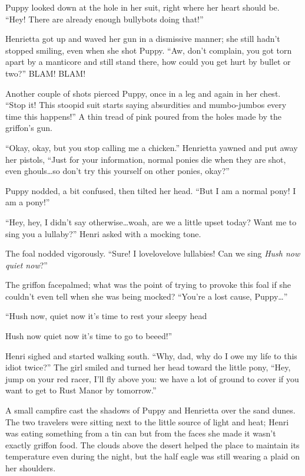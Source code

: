 Puppy looked down at the hole in her suit, right where her heart should be. ``Hey! There are already enough bullybots doing that!''

Henrietta got up and waved her gun in a dismissive manner; she still hadn't stopped smiling, even when she shot Puppy. ``Aw, don't complain, you got torn apart by a manticore and still stand there, how could you get hurt by bullet or two?'' BLAM! BLAM!

Another couple of shots pierced Puppy, once in a leg and again in her chest. ``Stop it! This stoopid suit starts saying absurdities and mumbo-jumbos every time this happens!'' A thin tread of pink poured from the holes made by the griffon's gun.

``Okay, okay, but you stop calling me a chicken.'' Henrietta yawned and put away her pistols, ``Just for your information, normal ponies die when they are shot, even ghouls\dots so don't try this yourself on other ponies, okay?''

Puppy nodded, a bit confused, then tilted her head. ``But I am a normal pony! I am a pony!''

``Hey, hey, I didn't say otherwise\dots woah, are we a little upset today? Want me to sing you a lullaby?'' Henri asked with a mocking tone.

The foal nodded vigorously. ``Sure! I lovelovelove lullabies! Can we sing \emph{Hush now quiet now}?''

The griffon facepalmed; what was the point of trying to provoke this foal if she couldn't even tell when she was being mocked? ``You're a lost cause, Puppy\dots ''


\begin{song}
    ``Hush now, quiet now it's time to rest your sleepy head
    
    Hush now quiet now it's time to go to beeed!''
\end{song}

Henri sighed and started walking south. ``Why, dad, why do I owe my life to this idiot twice?'' The girl smiled and turned her head toward the little pony, ``Hey, jump on your red racer, I'll fly above you: we have a lot of ground to cover if you want to get to Rust Manor by tomorrow.''

\horizonline


A small campfire cast the shadows of Puppy and Henrietta over the sand dunes. The two travelers were sitting next to the little source of light and heat; Henri was eating something from a tin can but from the faces she made it wasn't exactly griffon food. The clouds above the desert helped the place to maintain its temperature even during the night, but the half eagle was still wearing a plaid on her shoulders.

